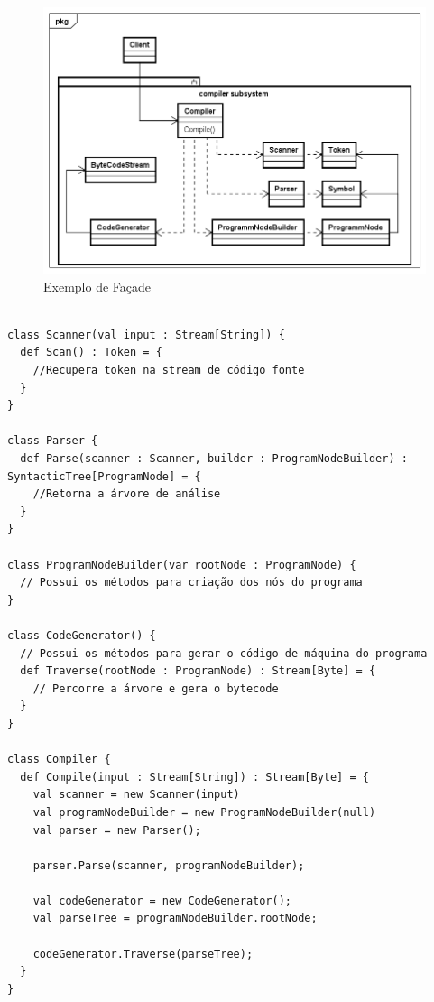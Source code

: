 \begin{figure}[htb]
	\caption{\label{facade_exemplo}Exemplo de Façade}
	\begin{center}
	    \includegraphics[scale=0.4]{5_padroes-contexto-funcional/5.2_estruturais/5.2.5_facade/facade_exemplo.png}
	\end{center}
\end{figure}


\begin{lstlisting}[caption={Façade Orientado a Objetos},label=oofacade]

class Scanner(val input : Stream[String]) {
  def Scan() : Token = {
    //Recupera token na stream de código fonte
  }
}

class Parser {
  def Parse(scanner : Scanner, builder : ProgramNodeBuilder) : SyntacticTree[ProgramNode] = {
    //Retorna a árvore de análise
  }
}

class ProgramNodeBuilder(var rootNode : ProgramNode) {
  // Possui os métodos para criação dos nós do programa
}

class CodeGenerator() {
  // Possui os métodos para gerar o código de máquina do programa
  def Traverse(rootNode : ProgramNode) : Stream[Byte] = {
    // Percorre a árvore e gera o bytecode
  }
}

class Compiler {
  def Compile(input : Stream[String]) : Stream[Byte] = {
    val scanner = new Scanner(input)
    val programNodeBuilder = new ProgramNodeBuilder(null)
    val parser = new Parser();

    parser.Parse(scanner, programNodeBuilder);

    val codeGenerator = new CodeGenerator();
    val parseTree = programNodeBuilder.rootNode;

    codeGenerator.Traverse(parseTree);
  }
}

\end{lstlisting}


